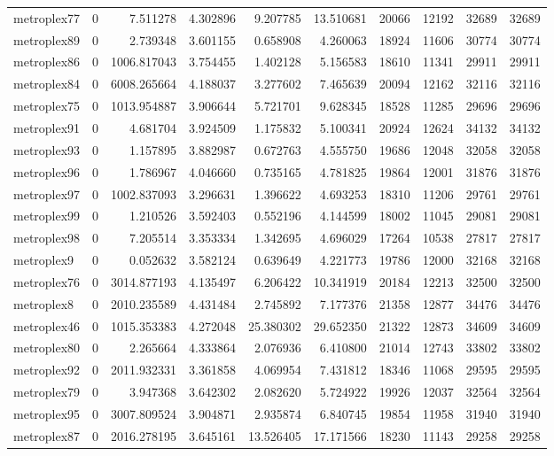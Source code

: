 \begin{longtable}{|l|r|r|r|r|r|r|r|r|r|}
metroplex77 & 0 & 7.511278 & 4.302896 & 9.207785 & 13.510681 & 20066 & 12192 & 32689 & 32689 \\
metroplex89 & 0 & 2.739348 & 3.601155 & 0.658908 & 4.260063 & 18924 & 11606 & 30774 & 30774 \\
metroplex86 & 0 & 1006.817043 & 3.754455 & 1.402128 & 5.156583 & 18610 & 11341 & 29911 & 29911 \\
metroplex84 & 0 & 6008.265664 & 4.188037 & 3.277602 & 7.465639 & 20094 & 12162 & 32116 & 32116 \\
metroplex75 & 0 & 1013.954887 & 3.906644 & 5.721701 & 9.628345 & 18528 & 11285 & 29696 & 29696 \\
metroplex91 & 0 & 4.681704 & 3.924509 & 1.175832 & 5.100341 & 20924 & 12624 & 34132 & 34132 \\
metroplex93 & 0 & 1.157895 & 3.882987 & 0.672763 & 4.555750 & 19686 & 12048 & 32058 & 32058 \\
metroplex96 & 0 & 1.786967 & 4.046660 & 0.735165 & 4.781825 & 19864 & 12001 & 31876 & 31876 \\
metroplex97 & 0 & 1002.837093 & 3.296631 & 1.396622 & 4.693253 & 18310 & 11206 & 29761 & 29761 \\
metroplex99 & 0 & 1.210526 & 3.592403 & 0.552196 & 4.144599 & 18002 & 11045 & 29081 & 29081 \\
metroplex98 & 0 & 7.205514 & 3.353334 & 1.342695 & 4.696029 & 17264 & 10538 & 27817 & 27817 \\
metroplex9 & 0 & 0.052632 & 3.582124 & 0.639649 & 4.221773 & 19786 & 12000 & 32168 & 32168 \\
metroplex76 & 0 & 3014.877193 & 4.135497 & 6.206422 & 10.341919 & 20184 & 12213 & 32500 & 32500 \\
metroplex8 & 0 & 2010.235589 & 4.431484 & 2.745892 & 7.177376 & 21358 & 12877 & 34476 & 34476 \\
metroplex46 & 0 & 1015.353383 & 4.272048 & 25.380302 & 29.652350 & 21322 & 12873 & 34609 & 34609 \\
metroplex80 & 0 & 2.265664 & 4.333864 & 2.076936 & 6.410800 & 21014 & 12743 & 33802 & 33802 \\
metroplex92 & 0 & 2011.932331 & 3.361858 & 4.069954 & 7.431812 & 18346 & 11068 & 29595 & 29595 \\
metroplex79 & 0 & 3.947368 & 3.642302 & 2.082620 & 5.724922 & 19926 & 12037 & 32564 & 32564 \\
metroplex95 & 0 & 3007.809524 & 3.904871 & 2.935874 & 6.840745 & 19854 & 11958 & 31940 & 31940 \\
metroplex87 & 0 & 2016.278195 & 3.645161 & 13.526405 & 17.171566 & 18230 & 11143 & 29258 & 29258 \\

\end{longtable}
